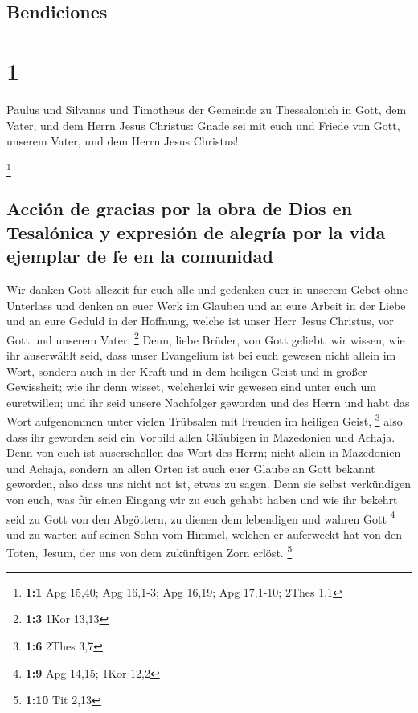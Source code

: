 \hypertarget{bendiciones}{%
\subsection{Bendiciones}\label{bendiciones}}

\hypertarget{section}{%
\section{1}\label{section}}

 Paulus und Silvanus und Timotheus der Gemeinde zu
Thessalonich in Gott, dem Vater, und dem Herrn Jesus Christus: Gnade sei
mit euch und Friede von Gott, unserem Vater, und dem Herrn Jesus
Christus!

\footnote{\textbf{1:1} Apg 15,40; Apg 16,1-3; Apg 16,19; Apg 17,1-10;
  2Thes 1,1}

\hypertarget{acciuxf3n-de-gracias-por-la-obra-de-dios-en-tesaluxf3nica-y-expresiuxf3n-de-alegruxeda-por-la-vida-ejemplar-de-fe-en-la-comunidad}{%
\subsection{Acción de gracias por la obra de Dios en Tesalónica y
expresión de alegría por la vida ejemplar de fe en la
comunidad}\label{acciuxf3n-de-gracias-por-la-obra-de-dios-en-tesaluxf3nica-y-expresiuxf3n-de-alegruxeda-por-la-vida-ejemplar-de-fe-en-la-comunidad}}

 Wir danken Gott allezeit für euch alle und gedenken euer
in unserem Gebet ohne Unterlass  und denken an euer Werk
im Glauben und an eure Arbeit in der Liebe und an eure Geduld in der
Hoffnung, welche ist unser Herr Jesus Christus, vor Gott und unserem
Vater. \footnote{\textbf{1:3} 1Kor 13,13}  Denn, liebe
Brüder, von Gott geliebt, wir wissen, wie ihr auserwählt seid,
 dass unser Evangelium ist bei euch gewesen nicht allein
im Wort, sondern auch in der Kraft und in dem heiligen Geist und in
großer Gewissheit; wie ihr denn wisset, welcherlei wir gewesen sind
unter euch um euretwillen;  und ihr seid unsere Nachfolger
geworden und des Herrn und habt das Wort aufgenommen unter vielen
Trübsalen mit Freuden im heiligen Geist, \footnote{\textbf{1:6} 2Thes
  3,7}  also dass ihr geworden seid ein Vorbild allen
Gläubigen in Mazedonien und Achaja.  Denn von euch ist
auserschollen das Wort des Herrn; nicht allein in Mazedonien und Achaja,
sondern an allen Orten ist auch euer Glaube an Gott bekannt geworden,
also dass uns nicht not ist, etwas zu sagen.  Denn sie
selbst verkündigen von euch, was für einen Eingang wir zu euch gehabt
haben und wie ihr bekehrt seid zu Gott von den Abgöttern, zu dienen dem
lebendigen und wahren Gott \footnote{\textbf{1:9} Apg 14,15; 1Kor 12,2}
 und zu warten auf seinen Sohn vom Himmel, welchen er
auferweckt hat von den Toten, Jesum, der uns von dem zukünftigen Zorn
erlöst. \footnote{\textbf{1:10} Tit 2,13}

